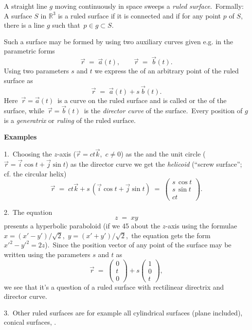 \documentclass[12pt]{article}
\theoremstyle{definition}
\begin{document}
A straight line $g$ moving continuously in space sweeps a {\em ruled surface}.\,  Formally:\, A surface $S$ in $\mathbb{R}^3$ is a ruled surface if it is connected and if for any point $p$ of $S$, there is a line $g$ such that\, $p\in g\subset S$. 

 Such a surface may be formed by using two auxiliary curves given e.g. in the parametric forms
$$\vec{r} \;=\; \vec{a}(t), \qquad \vec{r} \;=\; \vec{b}(t).$$
 Using two parameters $s$ and $t$ we express the 
  of  an arbitrary point of the ruled surface as
$$\vec{r} \;=\; \vec{a}(t)+ s\,\vec{b}(t).$$
Here\, $\vec{r} = \vec{a}(t)$\, is a curve on the ruled surface and is called  or the 
 of the surface, while\, $\vec{r} = \vec{b}(t)$\, is the {\em director curve} of the surface.\, Every position of $g$ is a {\em generatrix} or {\em ruling} of the ruled surface.

\textbf{Examples}

1.\, Choosing the $z$-axis ($\vec{r} = ct\vec{k}$,\, $c \neq 0$) as the  and the unit circle ($\vec{r} = \vec{i}\cos{t}+\vec{j}\sin{t}$) 
as the director curve we get the {\em helicoid} (``screw surface''; cf. the circular helix)
$$\vec{r} \;=\; ct\vec{k}+ s\,(\vec{i}\cos{t}+\vec{j}\sin{t}) \;=\;
   \left(\!\begin{array}{c}s\,\cos{t}\\ s\,\sin{t}\\ ct\end{array}\!\right)\!.$$


2.\, The equation\,
$$z \;=\; xy$$
presents a hyperbolic paraboloid (if we  45  about the $z$-axis using the formulae\, $x = (x'-y')/\sqrt{2}$,\, 
$y = (x'+y')/\sqrt{2}$,\, the equation gets the form\, $x'^2-y'^2 = 2z$).\, Since the position vector of any point of the surface may be written using the parameters $s$ and $t$ as
$$\vec{r} \;=\; \left(\!\begin{array}{c}0\\ t\\ 0\end{array}\!\right)\!
+s\left(\!\begin{array}{c}1\\ 0\\ t\end{array}\!\right)\!,$$
we see that it's a question of a ruled surface with rectilinear directrix and director curve.

3.\, Other ruled surfaces are for example all cylindrical 
surfaces (plane included), conical surfaces, 
.
\end{document}
